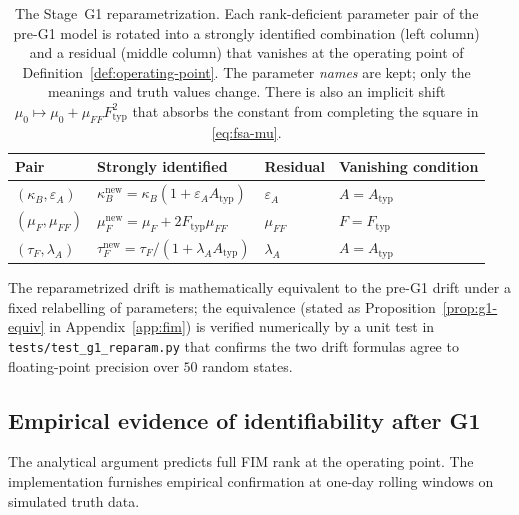 \begin{table}[h]
\centering
\small
\begin{tabular}{@{}llll@{}}
\toprule
Pair & Strongly identified & Residual & Vanishing condition \\
\midrule
$(\kappa_B,\varepsilon_A)$  & $\kappa_B^{\mathrm{new}} = \kappa_B(1+\varepsilon_A A_{\mathrm{typ}})$
                             & $\varepsilon_A$  & $A = A_{\mathrm{typ}}$ \\
$(\mu_F,\mu_{FF})$          & $\mu_F^{\mathrm{new}} = \mu_F + 2 F_{\mathrm{typ}} \mu_{FF}$
                             & $\mu_{FF}$       & $F = F_{\mathrm{typ}}$ \\
$(\tau_F,\lambda_A)$        & $\tau_F^{\mathrm{new}} = \tau_F/(1+\lambda_A A_{\mathrm{typ}})$
                             & $\lambda_A$      & $A = A_{\mathrm{typ}}$ \\
\bottomrule
\end{tabular}
\caption{The Stage~G1 reparametrization. Each rank-deficient parameter
pair of the pre-G1 model is rotated into a strongly identified
combination (left column) and a residual (middle column) that
vanishes at the operating point of
Definition~\ref{def:operating-point}. The parameter \emph{names} are
kept; only the meanings and truth values change. There is also an
implicit shift $\mu_0 \mapsto \mu_0 + \mu_{FF} F_{\mathrm{typ}}^2$
that absorbs the constant from completing the square in
\eqref{eq:fsa-mu}.}
\label{tab:g1-reparam}
\end{table}

The reparametrized drift is mathematically equivalent to the pre-G1
drift under a fixed relabelling of parameters; the equivalence
(stated as Proposition~\ref{prop:g1-equiv} in
Appendix~\ref{app:fim}) is verified numerically by a unit test in
\texttt{tests/test\_g1\_reparam.py} that confirms the two drift
formulas agree to floating-point precision over $50$ random states.

\subsection{Empirical evidence of identifiability after G1}\label{sec:fim-empirical}

The analytical argument predicts full FIM rank at the operating
point. The implementation furnishes empirical confirmation at
one-day rolling windows on simulated truth data.

